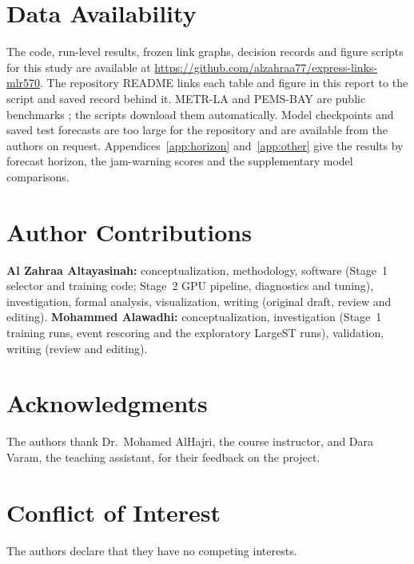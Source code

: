 \documentclass[journal]{IEEEtran}
\begin{document}
\section*{Data Availability}
The code, run-level results, frozen link graphs, decision records and figure scripts for this study are available at \url{https://github.com/alzahraa77/express-links-mlr570}. The repository README links each table and figure in this report to the script and saved record behind it. METR-LA and PEMS-BAY are public benchmarks \cite{li2018dcrnn}; the scripts download them automatically. Model checkpoints and saved test forecasts are too large for the repository and are available from the authors on request. Appendices~\ref{app:horizon} and~\ref{app:other} give the results by forecast horizon, the jam-warning scores and the supplementary model comparisons.

\section*{Author Contributions}
\textbf{Al Zahraa Altayasinah:} conceptualization, methodology, software (Stage~1 selector and training code; Stage~2 GPU pipeline, diagnostics and tuning), investigation, formal analysis, visualization, writing (original draft, review and editing). \textbf{Mohammed Alawadhi:} conceptualization, investigation (Stage~1 training runs, event rescoring and the exploratory LargeST runs), validation, writing (review and editing).

\section*{Acknowledgments}
The authors thank Dr.\ Mohamed AlHajri, the course instructor, and Dara Varam, the teaching assistant, for their feedback on the project.

\section*{Conflict of Interest}
The authors declare that they have no competing interests.




\FloatBarrier
\onecolumn
\appendices
\end{document}

